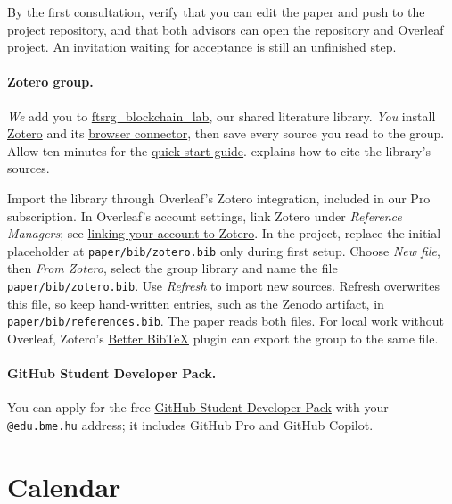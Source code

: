 By the first consultation, verify that you can edit the paper and push to the project repository, and that both advisors can open the repository and Overleaf project. An invitation waiting for acceptance is still an unfinished step.

\paragraph{Zotero group.} \emph{We} add you to \href{https://www.zotero.org/groups/6715800/ftsrg_blockchain_lab}{ftsrg\_blockchain\_lab}, our shared literature library. \emph{You} install \href{https://www.zotero.org/}{Zotero} and its \href{https://www.zotero.org/download/connectors}{browser connector}, then save every source you read to the group. Allow ten minutes for the \href{https://www.zotero.org/support/quick_start_guide}{quick start guide}.  explains how to cite the library's sources.

Import the library through Overleaf's Zotero integration, included in our Pro subscription. In Overleaf's account settings, link Zotero under \emph{Reference Managers}; see \href{https://www.overleaf.com/learn/how-to/How_to_link_your_Overleaf_account_to_Mendeley_and_Zotero}{linking your account to Zotero}. In the project, replace the initial placeholder at \texttt{paper/bib/zotero.bib} only during first setup. Choose \emph{New file}, then \emph{From Zotero}, select the group library and name the file \texttt{paper/bib/zotero.bib}. Use \emph{Refresh} to import new sources. Refresh overwrites this file, so keep hand-written entries, such as the Zenodo artifact, in \texttt{paper/bib/references.bib}. The paper reads both files. For local work without Overleaf, Zotero's \href{https://retorque.re/zotero-better-bibtex/}{Better BibTeX} plugin can export the group to the same file.

\paragraph{GitHub Student Developer Pack.} You can apply for the free \href{https://education.github.com/pack}{GitHub Student Developer Pack} with your \texttt{@edu.bme.hu} address; it includes GitHub Pro and GitHub Copilot.



\section{Calendar}\label{guide:start:calendar}

